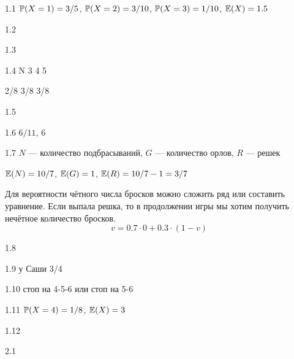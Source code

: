 \protect \hypertarget {soln:1.1}{}
\begin{solution}{{1.1}}
  $\P(X=1)=3/5$, $\P(X=2)=3/10$, $\P(X=3)=1/10$, $\E(X)=1.5$
\end{solution}
\protect \hypertarget {soln:1.2}{}
\begin{solution}{{1.2}}
\end{solution}
\protect \hypertarget {soln:1.3}{}
\begin{solution}{{1.3}}
\end{solution}
\protect \hypertarget {soln:1.4}{}
\begin{solution}{{1.4}}
   N 3 4 5

  2/8 3/8 3/8
\end{solution}
\protect \hypertarget {soln:1.5}{}
\begin{solution}{{1.5}}
\end{solution}
\protect \hypertarget {soln:1.6}{}
\begin{solution}{{1.6}}
 $6/11$, $6$
\end{solution}
\protect \hypertarget {soln:1.7}{}
\begin{solution}{{1.7}}
  $N$ — количество подбрасываний, $G$ — количество орлов, $R$ — решек

  $\E(N)=10/7$, $\E(G)=1$, $\E(R)=10/7-1=3/7$

  Для вероятности чётного числа бросков можно сложить ряд или составить уравнение.
  Если выпала решка, то в продолжении игры мы хотим получить нечётное количество бросков.
  \[
     v = 0.7 \cdot 0 + 0.3 \cdot (1-v)
  \]
\end{solution}
\protect \hypertarget {soln:1.8}{}
\begin{solution}{{1.8}}
\end{solution}
\protect \hypertarget {soln:1.9}{}
\begin{solution}{{1.9}}
  у Саши 3/4
\end{solution}
\protect \hypertarget {soln:1.10}{}
\begin{solution}{{1.10}}
  стоп на 4-5-6 или стоп на 5-6
\end{solution}
\protect \hypertarget {soln:1.11}{}
\begin{solution}{{1.11}}
  $\P(X=4)=1/8$, $\E(X)=3$
\end{solution}
\protect \hypertarget {soln:1.12}{}
\begin{solution}{{1.12}}
\end{solution}
\protect \hypertarget {soln:2.1}{}
\begin{solution}{{2.1}}
\end{solution}
